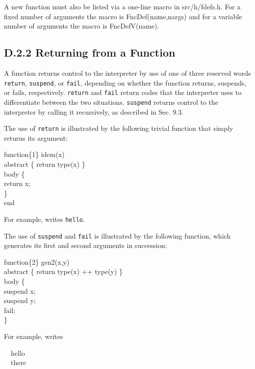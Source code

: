 A new function must also be listed via a one-line macro in
src/h/fdefs.h. For a fixed number of arguments the macro is
FncDef(name,nargs) and for a variable number of arguments
the macro is FncDefV(name).

\subsection[D.2.2 Returning from a Function]{D.2.2 Returning from a Function}

A function returns control to the interpreter by use of one of three
reserved words
\texttt{return}, \texttt{suspend}, or \texttt{fail}, depending on whether the
function returns, suspends, or fails, respectively. \texttt{return} and
\texttt{fail} return codes that the interpreter uses to differentiate between
the two situations. \texttt{suspend} returns control to the interpreter by
calling it recursively, as described in Sec. 9.3.

The use of \texttt{return} is illustrated by the following trivial function
that simply returns its argument:
\goodbreak
\begin{iconcode}
function\{1\} idem(x)\\
abstract \{ return type(x) \} \\
body \{\\
\>return x;\\
\> \} \\
end
\end{iconcode}
\noindent
For example,
\noindent writes \texttt{hello}.

The use of \texttt{suspend} and \texttt{fail} is illustrated by the
following function, which generates its first and second arguments in
succession:
\goodbreak
\begin{iconcode}
function\{2\} gen2(x,y)\\
abstract \{ return type(x) ++ type(y) \} \\
body \{\\
\>suspend x;\\
\>suspend y;\\
\>fail;\\
\}
\end{iconcode}
\noindent
For example,
\noindent
writes
\goodbreak
\begin{iconcode}
\ \ hello\\
\ \ there
\end{iconcode}

